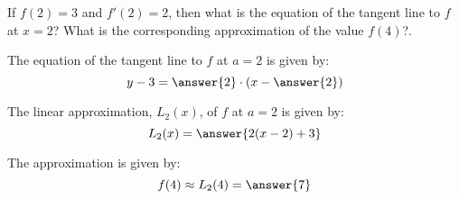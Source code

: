 \documentclass{ximera}
\author{Steven Gubkin}
\begin{document}
\begin{exercise}
If $f(2)=3$ and $f'(2) = 2$, then what is the equation of the tangent line to $f$ at $x=2$? What is the
corresponding approximation of the value $f(4)$?.

\begin{prompt}
The equation of the tangent line to $f$ at $a=2$ is given by:
 \[ y-3 = \answer{2}\cdot(x-\answer{2})\]
 
The linear approximation, $L_2(x)$, of $f$ at $a=2$ is given by:
 \[L_2(x) = \answer{2(x-2)+3}\]
  
 The approximation is given by:
\[ f(4) \approx L_2(4)= \answer{7}\]
\end{prompt}

\end{exercise}
\end{document}
